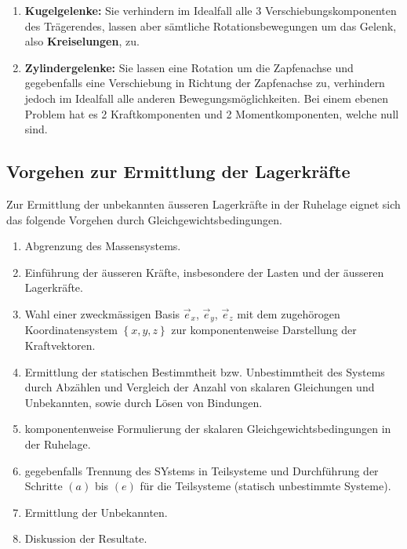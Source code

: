 \begin{enumerate}[$(a)$]
\item \textbf{Kugelgelenke:} Sie verhindern im Idealfall alle 3 Verschiebungskomponenten des Trägerendes, lassen aber sämtliche Rotationsbewegungen um das Gelenk, also \textbf{Kreiselungen}, zu. 
\item \textbf{Zylindergelenke:} Sie lassen eine Rotation um die Zapfenachse und gegebenfalls eine Verschiebung in Richtung der Zapfenachse zu, verhindern jedoch im Idealfall alle anderen Bewegungsmöglichkeiten. Bei einem ebenen Problem hat es 2 Kraftkomponenten und 2 Momentkomponenten, welche null sind.
\end{enumerate}
\subsection{Vorgehen zur Ermittlung der Lagerkräfte}
Zur Ermittlung der unbekannten äusseren Lagerkräfte in der Ruhelage eignet sich das folgende Vorgehen durch Gleichgewichtsbedingungen.
\begin{enumerate}[$(a)$]
\item Abgrenzung des Massensystems.
\item Einführung der äusseren Kräfte, insbesondere der Lasten und der äusseren Lagerkräfte.
\item Wahl einer zweckmässigen Basis $\overrightarrow{e}_x$, $\overrightarrow{e}_y$, $\overrightarrow{e}_z$ mit dem zugehörogen Koordinatensystem $\left\{x, y, z\right\}$ zur komponentenweise Darstellung der Kraftvektoren.
\item Ermittlung der statischen Bestimmtheit bzw. Unbestimmtheit des Systems durch Abzählen und Vergleich der Anzahl von skalaren Gleichungen und Unbekannten, sowie durch Lösen von Bindungen.
\item komponentenweise Formulierung der skalaren Gleichgewichtsbedingungen in der Ruhelage.
\item gegebenfalls Trennung des SYstems in Teilsysteme und Durchführung der Schritte $\left(a\right)$ bis $\left(e\right)$ für die Teilsysteme (statisch unbestimmte Systeme).
\item Ermittlung der Unbekannten.
\item Diskussion der Resultate.
\end{enumerate}
